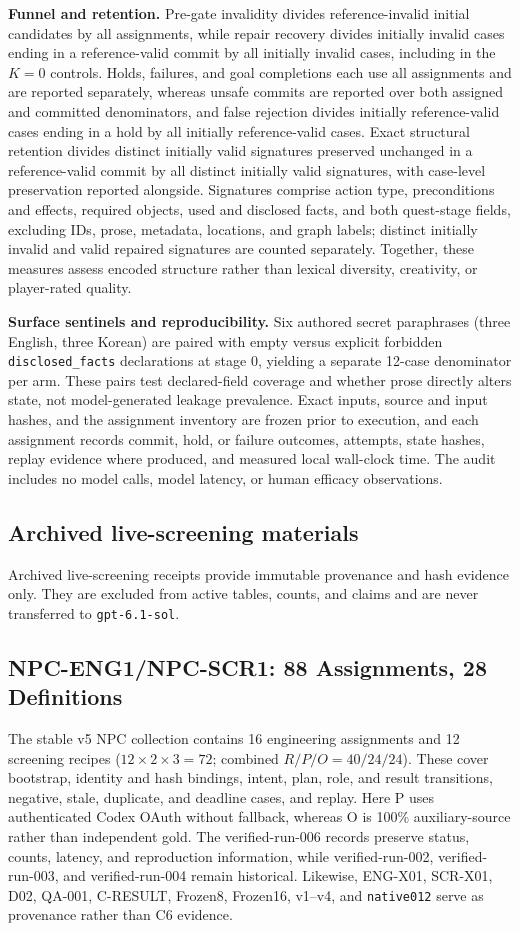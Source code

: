 \documentclass[journal]{IEEEtran}
\begin{document}
\textbf{Funnel and retention.} Pre-gate invalidity divides reference-invalid initial candidates by all assignments, while repair recovery divides initially invalid cases ending in a reference-valid commit by all initially invalid cases, including in the $K{=}0$ controls. Holds, failures, and goal completions each use all assignments and are reported separately, whereas unsafe commits are reported over both assigned and committed denominators, and false rejection divides initially reference-valid cases ending in a hold by all initially reference-valid cases. Exact structural retention divides distinct initially valid signatures preserved unchanged in a reference-valid commit by all distinct initially valid signatures, with case-level preservation reported alongside. Signatures comprise action type, preconditions and effects, required objects, used and disclosed facts, and both quest-stage fields, excluding IDs, prose, metadata, locations, and graph labels; distinct initially invalid and valid repaired signatures are counted separately. Together, these measures assess encoded structure rather than lexical diversity, creativity, or player-rated quality.

\textbf{Surface sentinels and reproducibility.} Six authored secret paraphrases (three English, three Korean) are paired with empty versus explicit forbidden \texttt{disclosed\_facts} declarations at stage $0$, yielding a separate 12-case denominator per arm. These pairs test declared-field coverage and whether prose directly alters state, not model-generated leakage prevalence. Exact inputs, source and input hashes, and the assignment inventory are frozen prior to execution, and each assignment records commit, hold, or failure outcomes, attempts, state hashes, replay evidence where produced, and measured local wall-clock time. The audit includes no model calls, model latency, or human efficacy observations.

\subsection{Archived live-screening materials}
Archived live-screening receipts provide immutable provenance and hash evidence only. They are excluded from active tables, counts, and claims and are never transferred to \texttt{gpt-6.1-sol}.
\subsection{NPC-ENG1/NPC-SCR1: 88 Assignments, 28 Definitions}
The stable v5 NPC collection contains 16 engineering assignments and 12 screening recipes ($12\times2\times3=72$; combined $R/P/O=40/24/24$). These cover bootstrap, identity and hash bindings, intent, plan, role, and result transitions, negative, stale, duplicate, and deadline cases, and replay. Here P uses authenticated Codex OAuth without fallback, whereas O is 100\% auxiliary-source rather than independent gold. The verified-run-006 records preserve status, counts, latency, and reproduction information, while verified-run-002, verified-run-003, and verified-run-004 remain historical. Likewise, ENG-X01, SCR-X01, D02, QA-001, C-RESULT, Frozen8, Frozen16, v1--v4, and \texttt{native012} serve as provenance rather than C6 evidence.
\end{document}
